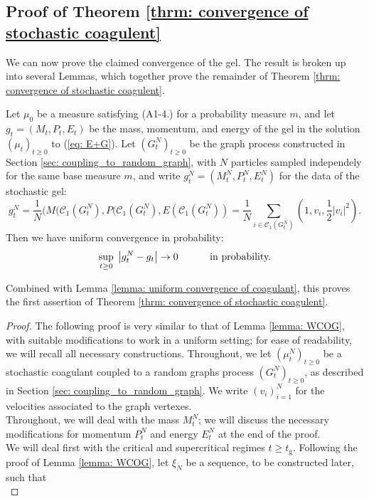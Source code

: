   \subsection{Proof of Theorem \ref{thrm: convergence of stochastic coagulent}}
   We can now prove the claimed convergence of the gel. The result is broken up into several Lemmas, which together prove the remainder of Theorem \ref{thrm: convergence of stochastic coagulent}.
  \begin{lemma}\label{lemma: COG} Let $\mu_0$ be a measure satisfying ({A1}-{4}.) for a probability measure $m$, and let $g_t=(M_t,P_t,E_t)$ be the mass, momentum, and energy of the gel in the solution $(\mu_t)_{t\ge 0}$ to (\ref{eq: E+G}). Let $(G^N_t)_{t\ge 0}$ be the graph process constructed in Section \ref{sec: coupling_to_random_graph}, with $N$ particles sampled independely for the same base measure $m$, and write $g^N_t=(M^N_t, P^N_t, E^N_t)$ for the data of the stochastic gel: \begin{equation} g^N_t=\frac{1}{N}(M(\mathcal{C}_1(G^N_t),P(\mathcal{C}_1(G^N_t),E(\mathcal{C}_1(G^N_t))=\frac{1}{N}\sum_{i \in \mathcal{C}_1(G^N_t)} \left(1,v_i,\frac{1}{2}|v_i|^2\right). \end{equation} Then we have uniform convergence in probability: \begin{equation} \sup_{t\ge 0}\hspace{0.1cm}\left|g^N_t-g_t\right|\rightarrow 0 \hspace{1cm}\text{ in probability.}\end{equation}  \end{lemma} Combined with Lemma \ref{lemma: uniform convergence of coagulant}, this proves the first assertion of Theorem \ref{thrm: convergence of stochastic coagulent}. \begin{proof} The following proof is very similar to that of Lemma \ref{lemma: WCOG}, with suitable modifications to work in a uniform setting; for ease of readability, we will recall all necessary constructions.   Throughout, we let $(\mu^N_t)_{t\geq 0}$ be a stochastic coagulant coupled to a random graphs process $(G^N_t)_{t\geq 0}$, as described in Section \ref{sec: coupling_to_random_graph}. We write $(v_i)_{i=1}^N$ for the velocities associated to the graph vertexes. \medskip \\ Throughout, we will deal with the mass $M^N_t$; we will discuss the necessary modifications for momentum $P^N_t$ and energy $E^N_t$ at the end of the proof. \medskip \\ We will deal first with the critical and supercritical regimes $t\ge t_\mathrm{g}$. Following the proof of Lemma \ref{lemma: WCOG}, let $\xi_N$ be a sequence, to be constructed later, such that \begin{equation}\label{eq: choice of xiN}

\end{equation}
\end{proof}
